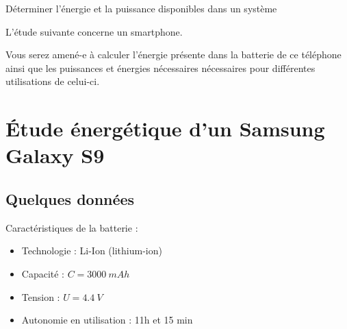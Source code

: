 \documentclass[10pt,fleqn]{article} %
\begin{document}

\begin{obj}
Déterminer l’énergie et la puissance disponibles dans un système

L’étude suivante concerne un smartphone. 

Vous serez amené-e à
 calculer l’énergie présente dans la batterie de ce téléphone ainsi que les puissances et énergies nécessaires
 nécessaires pour différentes utilisations de celui-ci.
 
\end{obj}
\section{Étude énergétique d'un Samsung Galaxy S9}
\subsection{Quelques données}
Caractéristiques de la batterie :
\begin{itemize}
 \item Technologie : Li-Ion (lithium-ion)
\item Capacité : $ C = \SI{3000}{mAh} $
\item Tension : $U=\SI{4.4}{V}$
\item Autonomie en utilisation : 11h et 15 min
\end{itemize}
\end{document}
